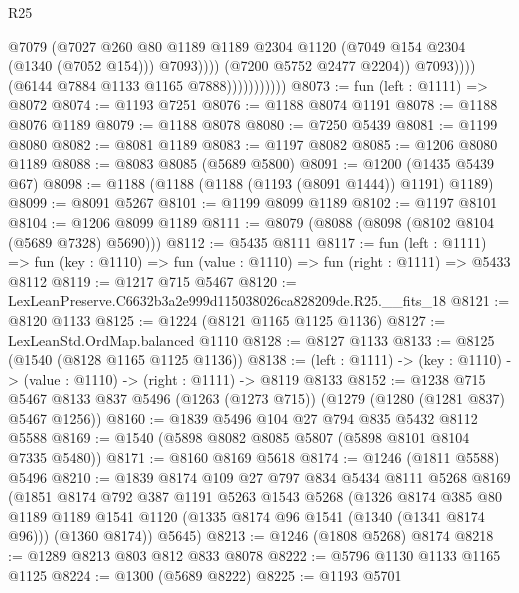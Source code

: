 \begin{lexlean}{R25}
\begin{coremodule}
                                        @7079
                                        (@7027
                                          @260
                                          @80
                                          @1189
                                          @1189
                                          @2304
                                          @1120
                                          (@7049 @154 @2304 (@1340 (@7052 @154)))
                                          @7093))))
                                  (@7200 @5752 @2477 @2204))
                                @7093))))
                        (@6144 @7884 @1133 @1165 @7888)))))))))))
@8073 := fun (left : @1111) => @8072
@8074 := @1193 @7251
@8076 := @1188 @8074 @1191
@8078 := @1188 @8076 @1189
@8079 := @1188 @8078
@8080 := @7250 @5439
@8081 := @1199 @8080
@8082 := @8081 @1189
@8083 := @1197 @8082
@8085 := @1206 @8080 @1189
@8088 := @8083 @8085 (@5689 @5800)
@8091 := @1200 (@1435 @5439 @67)
@8098 := @1188 (@1188 (@1188 (@1193 (@8091 @1444)) @1191) @1189)
@8099 := @8091 @5267
@8101 := @1199 @8099 @1189
@8102 := @1197 @8101
@8104 := @1206 @8099 @1189
@8111 := @8079 (@8088 (@8098 (@8102 @8104 (@5689 @7328) @5690)))
@8112 := @5435 @8111
@8117 := fun (left : @1111) =>
  fun (key : @1110) => fun (value : @1110) => fun (right : @1111) => @5433 @8112
@8119 := @1217 @715 @5467
@8120 := LexLeanPreserve.C6632b3a2e999d115038026ca828209de.R25.__fits_18
@8121 := @8120 @1133
@8125 := @1224 (@8121 @1165 @1125 @1136)
@8127 := LexLeanStd.OrdMap.balanced @1110
@8128 := @8127 @1133
@8133 := @8125 (@1540 (@8128 @1165 @1125 @1136))
@8138 := (left : @1111) -> (key : @1110) -> (value : @1110) -> (right : @1111) -> @8119 @8133
@8152 := @1238
    @715
    @5467
    @8133
    @837
    @5496
    (@1263 (@1273 @715))
    (@1279 (@1280 (@1281 @837) @5467 @1256))
@8160 := @1839 @5496 @104 @27 @794 @835 @5432 @8112 @5588
@8169 := @1540 (@5898 @8082 @8085 @5807 (@5898 @8101 @8104 @7335 @5480))
@8171 := @8160 @8169 @5618
@8174 := @1246 (@1811 @5588) @5496
@8210 := @1839
    @8174
    @109
    @27
    @797
    @834
    @5434
    @8111
    @5268
    @8169
    (@1851
      @8174
      @792
      @387
      @1191
      @5263
      @1543
      @5268
      (@1326
        @8174
        @385
        @80
        @1189
        @1189
        @1541
        @1120
        (@1335 @8174 @96 @1541 (@1340 (@1341 @8174 @96)))
        (@1360 @8174))
      @5645)
@8213 := @1246 (@1808 @5268) @8174
@8218 := @1289 @8213 @803 @812 @833 @8078
@8222 := @5796 @1130 @1133 @1165 @1125
@8224 := @1300 (@5689 @8222)
@8225 := @1193 @5701

\end{coremodule}
\end{lexlean}
